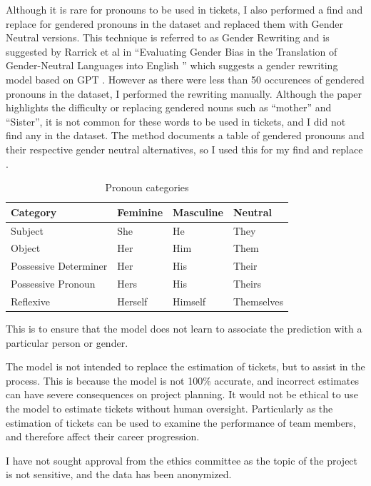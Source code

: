 \documentclass{UoYCSproject}
\begin{document}
    Although it is rare for pronouns to be used in tickets, I also performed a find and replace for gendered pronouns in the dataset and replaced them with Gender Neutral versions.
    This technique is referred to as Gender Rewriting and is suggested by Rarrick et al in ``Evaluating Gender Bias in the Translation of Gender-Neutral Languages into English
'' which suggests a gender rewriting model based on GPT \cite{rarrick2023evaluating}. However as there were less than 50 occurences of gendered pronouns in the dataset, I performed the rewriting manually.
    Although the paper highlights the difficulty or replacing gendered nouns such as ``mother'' and ``Sister'', it is not common for these words to be used in tickets, and I did not find any in the dataset.
    The method documents a table of gendered pronouns and their respective gender neutral alternatives, so I used this for my find and replace  .
\begin{table}
\centering
\begin{tabular}{llll}
\toprule
Category & Feminine & Masculine & Neutral \\
\midrule
Subject & She & He & They \\
Object & Her & Him & Them \\
Possessive Determiner & Her & His & Their \\
Possessive Pronoun & Hers & His & Theirs \\
Reflexive & Herself & Himself & Themselves \\
\bottomrule
\end{tabular}
\caption{Pronoun categories \cite{rarrick2023evaluating}}
\label{tab:pronoun_cats}
\end{table}

    This is to ensure that the model does not learn to associate the prediction with a particular person or gender.

    The model is not intended to replace the estimation of tickets, but to assist in the process. This is because the model is not 100\% accurate, and incorrect estimates can have severe consequences on project planning.
    It would not be ethical to use the model to estimate tickets without human oversight. Particularly as the estimation of tickets can be used to examine the performance of team members, and therefore affect their career progression.

    I have not sought approval from the ethics committee as the topic of the project is not sensitive, and the data has been anonymized.
\end{document}
